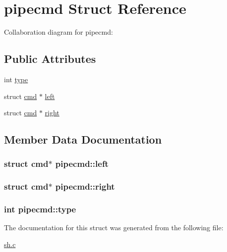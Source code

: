 \hypertarget{structpipecmd}{}\section{pipecmd Struct Reference}
\label{structpipecmd}


Collaboration diagram for pipecmd\+:
\subsection*{Public Attributes}
\begin{DoxyCompactItemize}
\item 
int \hyperlink{structpipecmd_a75d1d90b6721ac025c0062ec0947aaea}{type}
\item 
struct \hyperlink{structcmd}{cmd} $\ast$ \hyperlink{structpipecmd_a8922b7eac1f12f729cc7226b8b120f6f}{left}
\item 
struct \hyperlink{structcmd}{cmd} $\ast$ \hyperlink{structpipecmd_a882e2847aa340ae4e201d2e49921b47e}{right}
\end{DoxyCompactItemize}


\subsection{Member Data Documentation}
\subsubsection[{\texorpdfstring{left}{left}}]{\setlength{\rightskip}{0pt plus 5cm}struct {\bf cmd}$\ast$ pipecmd\+::left}\hypertarget{structpipecmd_a8922b7eac1f12f729cc7226b8b120f6f}{}\label{structpipecmd_a8922b7eac1f12f729cc7226b8b120f6f}
\subsubsection[{\texorpdfstring{right}{right}}]{\setlength{\rightskip}{0pt plus 5cm}struct {\bf cmd}$\ast$ pipecmd\+::right}\hypertarget{structpipecmd_a882e2847aa340ae4e201d2e49921b47e}{}\label{structpipecmd_a882e2847aa340ae4e201d2e49921b47e}
\subsubsection[{\texorpdfstring{type}{type}}]{\setlength{\rightskip}{0pt plus 5cm}int pipecmd\+::type}\hypertarget{structpipecmd_a75d1d90b6721ac025c0062ec0947aaea}{}\label{structpipecmd_a75d1d90b6721ac025c0062ec0947aaea}


The documentation for this struct was generated from the following file\+:\begin{DoxyCompactItemize}
\item 
\hyperlink{sh_8c}{sh.\+c}\end{DoxyCompactItemize}
